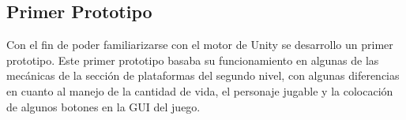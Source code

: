 \subsection{Primer Prototipo}
Con el fin de poder familiarizarse con el motor de Unity
se desarrollo un primer prototipo. Este primer prototipo basaba su funcionamiento en algunas de las mecánicas de la sección de plataformas del segundo nivel, con algunas diferencias en cuanto al manejo de la cantidad de vida, el personaje jugable y la colocación de algunos botones en la GUI del juego.
\\
\par